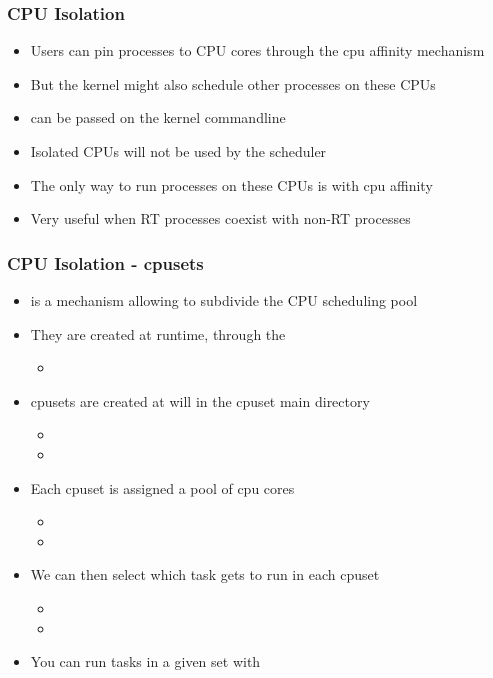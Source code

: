 \begin{frame}
	\frametitle{CPU Isolation}
	\begin{itemize}
		\item Users can pin processes to CPU cores through the cpu affinity mechanism
		\item But the kernel might also schedule other processes on these CPUs
		\item {} can be passed on the kernel commandline
		\item Isolated CPUs will not be used by the scheduler
		\item The only way to run processes on these CPUs is with cpu affinity
		\item Very useful when RT processes coexist with non-RT processes
	\end{itemize}
\end{frame}

\begin{frame}
	\frametitle{CPU Isolation - cpusets}
	\begin{itemize}
		\item {} is a mechanism allowing to subdivide the CPU scheduling pool
		\item They are created at runtime, through the 
			\begin{itemize}
				\item {}
			\end{itemize}
		\item cpusets are created at will in the cpuset main directory
			\begin{itemize}
				\item {}
				\item {}
			\end{itemize}
		\item Each cpuset is assigned a pool of cpu cores
			\begin{itemize}
				\item {}
				\item {}
			\end{itemize}
		\item We can then select which task gets to run in each cpuset
			\begin{itemize}
				\item {}
				\item {}
			\end{itemize}
		\item You can run tasks in a given set with 
	\end{itemize}
\end{frame}

